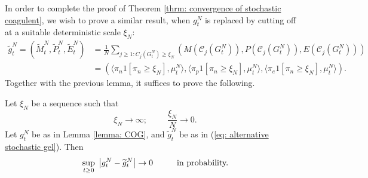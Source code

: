   In order to complete the proof of Theorem \ref{thrm: convergence of stochastic coagulent}, we wish to prove a similar result, when $g^N_t$ is replaced by cutting off at a suitable deterministic scale $\xi_N$: \begin{equation}\label{eq: alternative stochastic gel} \begin{split} \widetilde{g}^N_t=(\widetilde{M}^N_t,\widetilde{P}^N_t,\widetilde{E}^N_t)&=\frac{1}{N}\sum_{j\ge 1: C_j(G^N_t)\ge \xi_N}(M(\mathcal{C}_j(G^N_t)),P(\mathcal{C}_j(G^N_t)),E(\mathcal{C}_j(G^N_t))) \\[1ex] & = \left(\langle \pi_n1[\pi_n\ge \xi_N], \mu^N_t\rangle,\langle \pi_p1[\pi_n\ge \xi_N], \mu^N_t\rangle,\langle \pi_e1[\pi_n\ge \xi_N], \mu^N_t\rangle\right). \end{split} \end{equation} 
   Together with the previous lemma, it suffices to prove the following. \begin{lemma} Let $\xi_N$ be a sequence such that \begin{equation} \xi_N\rightarrow \infty; \hspace{1cm} \frac{\xi_N}{N}\rightarrow 0. \end{equation} Let $g^N_t$ be as in Lemma \ref{lemma: COG}, and $\widetilde{g}^N_t$ be as in (\ref{eq: alternative stochastic gel}). Then \begin{equation}
       \sup_{t\ge 0}\hspace{0.1cm} \left|g^N_t-\widetilde{g}^N_t\right|\rightarrow 0\hspace{1cm}\text{in probability.}
   \end{equation} \end{lemma} 
